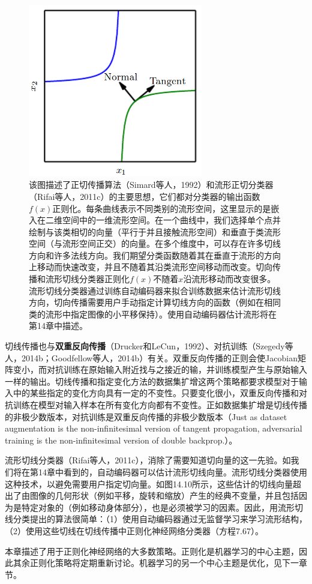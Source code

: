 \begin{figure}[htbp] %
   \centering
   \includegraphics[width=3in]{fig/chap7/7_9.png} 
   \caption{该图描述了正切传播算法（Simard等人，1992）和流形正切分类器（Rifai等人，2011c）的主要思想，它们都对分类器的输出函数$f(x)$正则化。每条曲线表示不同类别的流形空间，这里显示的是嵌入在二维空间中的一维流形空间。在一个曲线中，我们选择单个点并绘制与该类相切的向量（平行于并且接触流形空间）和垂直于类流形空间（与流形空间正交）的向量。在多个维度中，可以存在许多切线方向和许多法线方向。我们期望分类函数随着其在垂直于流形的方向上移动而快速改变，并且不随着其沿类流形空间移动而改变。切向传播和流形切线分类器正则化$f(x)$不随着$x$沿流形移动而改变很多。流形切线分类器通过训练自动编码器来拟合训练数据来估计流形切线方向，切向传播需要用户手动指定计算切线方向的函数（例如在相同类的流形中指定图像的小平移保持）。使用自动编码器估计流形将在第14章中描述。}
   \label{fig:7_9}
\end{figure}

切线传播也与\textbf{双重反向传播}（Drucker和LeCun，1992）、对抗训练（Szegedy等人，2014b；Goodfellow等人，2014b）有关。双重反向传播的正则会使Jacobian矩阵变小，而对抗训练在原始输入附近找与之接近的输，并训练模型产生与原始输入一样的输出。切线传播和指定变化方法的数据集扩增这两个策略都要求模型对于输入中的某些指定的变化方向具有一定的不变性。只要变化很小，双重反向传播和对抗训练在模型对输入样本在所有变化方向都有不变性。正如数据集扩增是切线传播的非极少数版本，对抗训练是双重反向传播的非极少数版本（Just as dataset augmentation is the non-inﬁnitesimal version of tangent propagation, adversarial training is the non-inﬁnitesimal version of double backprop.）。

流形切线分类器（Rifai等人，2011c），消除了需要知道切向量的这一先验。如我们将在第14章中看到的，自动编码器可以估计流形切线向量。流形切线分类器使用这种技术，以避免需要用户指定切向量。如图14.10所示，这些估计的切线向量超出了由图像的几何形状（例如平移，旋转和缩放）产生的经典不变量，并且包括因为是特定对象的（例如移动身体部分），也是必须被学习的因素。因此，用流形切线分类提出的算法很简单：（1）使用自动编码器通过无监督学习来学习流形结构，（2）使用这些切线在切线传播中正则化神经网络分类器（方程7.67）。

本章描述了用于正则化神经网络的大多数策略。正则化是机器学习的中心主题，因此其余正则化策略将定期重新讨论。机器学习的另一个中心主题是优化，见下一章节。